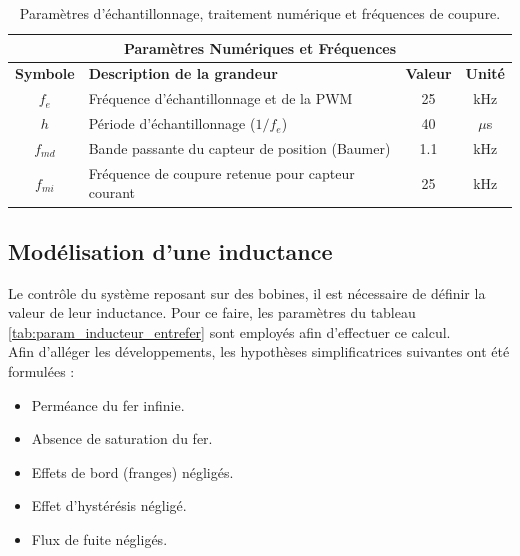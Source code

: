 \begin{table}[H]
    \centering
    \renewcommand{\arraystretch}{1.2}
    \begin{tabular}{|c|l|c|c|}
        \hline
        \multicolumn{4}{|c|}{\textbf{Paramètres Numériques et Fréquences}}                                      \\ \hline
        \textbf{Symbole} & \textbf{Description de la grandeur}               & \textbf{Valeur} & \textbf{Unité} \\ \hline
        $f_e$            & Fréquence d'échantillonnage et de la PWM          & 25              & kHz            \\ \hline
        $h$              & Période d'échantillonnage ($1 / f_e$)             & 40              & $\mu$s         \\ \hline
        $f_{md}$         & Bande passante du capteur de position (Baumer)    & 1.1             & kHz            \\ \hline
        $f_{mi}$         & Fréquence de coupure retenue pour capteur courant & 25              & kHz            \\ \hline
    \end{tabular}
    \caption{Paramètres d'échantillonnage, traitement numérique et fréquences de coupure.}
    \label{tab:param_numeriques_frequences}
\end{table}

\subsection{Modélisation d'une inductance}
Le contrôle du système reposant sur des bobines, il est nécessaire de définir la valeur de leur inductance. Pour ce faire, les paramètres du tableau \ref{tab:param_inducteur_entrefer} sont employés afin d'effectuer ce calcul.\\

Afin d'alléger les développements, les hypothèses simplificatrices suivantes ont été formulées :
\begin{itemize}
    \item Perméance du fer infinie.
    \item Absence de saturation du fer.
    \item Effets de bord (franges) négligés.
    \item Effet d’hystérésis négligé.
    \item Flux de fuite négligés.
\end{itemize}

